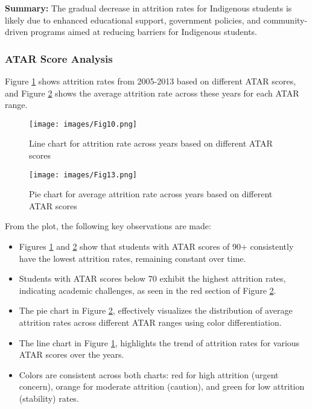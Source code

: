 \documentclass[conference]{IEEEtran}
\begin{document}
\textbf{Summary:} The gradual decrease in attrition rates for Indigenous students is likely due to enhanced educational support, government policies, and community-driven programs aimed at reducing barriers for Indigenous students.


\subsubsection{ATAR Score Analysis}

Figure \ref{fig:line3} shows attrition rates from 2005-2013 based on different ATAR scores, and Figure \ref{fig:pie3} shows the average attrition rate across these years for each ATAR range.

\begin{figure}[H] 
    \centering 
    \texttt{[image: images/Fig10.png]} 
    \caption{Line chart for attrition rate across years based on different ATAR scores} 
    \label{fig:line3} 
\end{figure}

\begin{figure}[H] 
    \centering 
    \texttt{[image: images/Fig13.png]} 
    \caption{Pie chart for average attrition rate across years based on different ATAR scores} 
    \label{fig:pie3}
\end{figure}

\par From the plot, the following key observations are made: 
\begin{itemize} 
    \item Figures \ref{fig:line3} and \ref{fig:pie3}
 show that students with ATAR scores of 90+ consistently have the lowest attrition rates, remaining constant over time.
    \item Students with ATAR scores below 70 exhibit the highest attrition rates, indicating academic challenges, as seen in the red section of Figure \ref{fig:pie3}. 
    \item The pie chart in Figure \ref{fig:pie3}, effectively visualizes the distribution of average attrition rates across different ATAR ranges using color differentiation. 
    \item The line chart in Figure \ref{fig:line3}, highlights the trend of attrition rates for various ATAR scores over the years.
    \item Colors are consistent across both charts: red for high attrition (urgent concern), orange for moderate attrition (caution), and green for low attrition (stability) rates.
\end{itemize}
\end{document}
